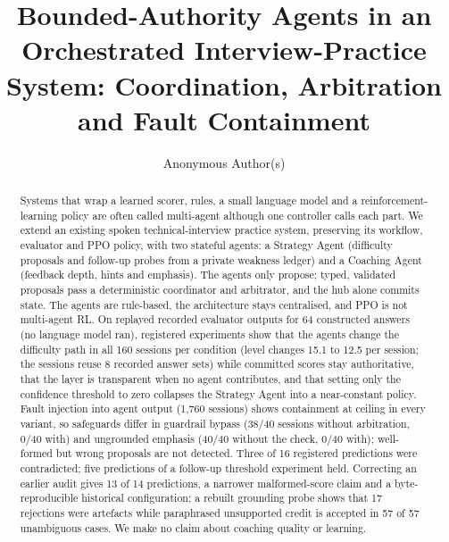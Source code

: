 \documentclass[runningheads]{llncs}
\begin{document}
\title{Bounded-Authority Agents in an Orchestrated Interview-Practice System: Coordination, Arbitration and Fault Containment}
\author{Anonymous Author(s)}
\maketitle

\begin{abstract}
Systems that wrap a learned scorer, rules, a small language model and a reinforcement-learning policy are often called multi-agent although one controller calls each part. We extend an existing spoken technical-interview practice system, preserving its workflow, evaluator and PPO policy, with two stateful agents: a Strategy Agent (difficulty proposals and follow-up probes from a private weakness ledger) and a Coaching Agent (feedback depth, hints and emphasis). The agents only propose; typed, validated proposals pass a deterministic coordinator and arbitrator, and the hub alone commits state. The agents are rule-based, the architecture stays centralised, and PPO is not multi-agent RL. On replayed recorded evaluator outputs for 64 constructed answers (no language model ran), registered experiments show that the agents change the difficulty path in all 160 sessions per condition (level changes 15.1 to 12.5 per session; the sessions reuse 8 recorded answer sets) while committed scores stay authoritative, that the layer is transparent when no agent contributes, and that setting only the confidence threshold to zero collapses the Strategy Agent into a near-constant policy. Fault injection into agent output (1,760 sessions) shows containment at ceiling in every variant, so safeguards differ in guardrail bypass (38/40 sessions without arbitration, 0/40 with) and ungrounded emphasis (40/40 without the check, 0/40 with); well-formed but wrong proposals are not detected. Three of 16 registered predictions were contradicted; five predictions of a follow-up threshold experiment held. Correcting an earlier audit gives 13 of 14 predictions, a narrower malformed-score claim and a byte-reproducible historical configuration; a rebuilt grounding probe shows that 17 rejections were artefacts while paraphrased unsupported credit is accepted in 57 of 57 unambiguous cases. We make no claim about coaching quality or learning.
\end{abstract}













\end{document}

